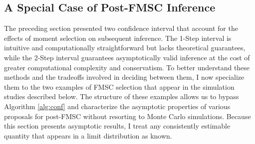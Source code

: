 \subsection{A Special Case of Post-FMSC Inference}
\label{sec:limitexperiment}
The preceding section presented two confidence interval that account for the effects of moment selection on subsequent inference.
The 1-Step interval is intuitive and computationally straightforward but lacks theoretical guarantees, while the 2-Step interval guarantees asymptotically valid inference at the cost of greater computational complexity and conservatism.
To better understand these methods and the tradeoffs involved in deciding between them, I now specialize them to the two examples of FMSC selection that appear in the simulation studies described below.
The structure of these examples allows us to bypass Algorithm \ref{alg:conf} and characterize the asymptotic properties of various proposals for post-FMSC without resorting to Monte Carlo simulations.
Because this section presents asymptotic results, I treat any consistently estimable quantity that appears in a limit distribution as known.

